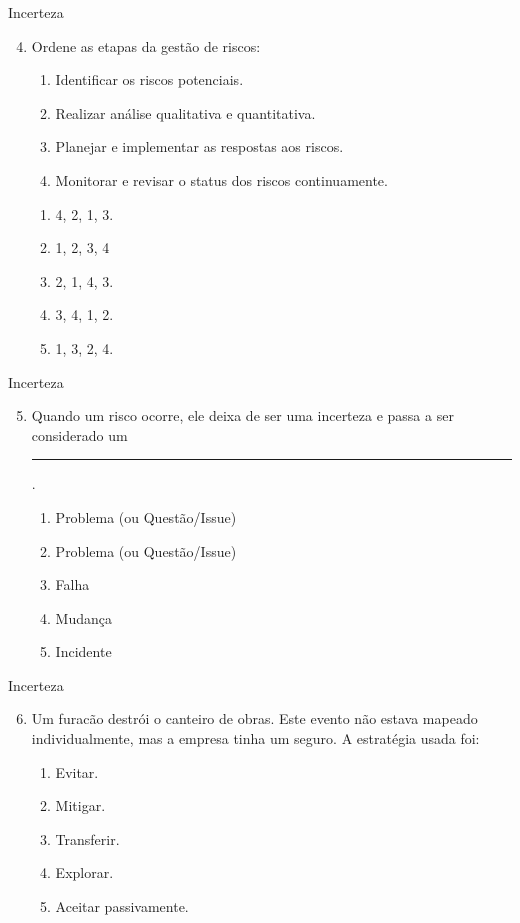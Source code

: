 \documentclass{beamer}
\begin{document}
\begin{frame}{Incerteza}
	\begin{enumerate}
		\setcounter{enumi}{3}
		\justifying
		\item Ordene as etapas da gestão de riscos:
		\begin{enumerate}[I]
			\item Identificar os riscos potenciais.
			\item Realizar análise qualitativa e quantitativa.
			\item Planejar e implementar as respostas aos riscos.
			\item Monitorar e revisar o status dos riscos continuamente.
		\end{enumerate}
		\begin{enumerate}[a]
			\item 4, 2, 1, 3.
			\item \alert<2>{1, 2, 3, 4}
			\item 2, 1, 4, 3.
			\item 3, 4, 1, 2.
			\item 1, 3, 2, 4.
		\end{enumerate}
	\end{enumerate}
\end{frame}

\begin{frame}{Incerteza}
	\begin{enumerate}
		\setcounter{enumi}{4}
		\justifying
		\item Quando um risco ocorre, ele deixa de ser uma incerteza e passa a ser considerado um \rule{60pt}{1pt}.
		\begin{enumerate}[a]
			\item Problema (ou Questão/Issue)
			\item \alert<2>{Problema (ou Questão/Issue)}
			\item Falha
			\item Mudança
			\item Incidente
		\end{enumerate}
	\end{enumerate}
\end{frame}

\begin{frame}{Incerteza}
	\begin{enumerate}
		\setcounter{enumi}{5}
		\justifying
		\item Um furacão destrói o canteiro de obras. Este evento não estava mapeado individualmente, mas a empresa tinha um seguro. A estratégia usada foi:
		\begin{enumerate}[a]
			\item Evitar.
			\item Mitigar.
			\item \alert<2>{Transferir.}
			\item Explorar.
			\item Aceitar passivamente.
		\end{enumerate}
	\end{enumerate}
\end{frame}
\end{document}
